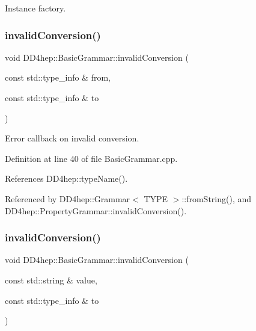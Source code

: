 Instance factory. 

\hypertarget{class_d_d4hep_1_1_basic_grammar_ac609599119a3a478c5701d0b18d4992a}{}\label{class_d_d4hep_1_1_basic_grammar_ac609599119a3a478c5701d0b18d4992a} 
\subsubsection{\texorpdfstring{invalid\+Conversion()}{invalidConversion()}\hspace{0.1cm}{\footnotesize\ttfamily [1/2]}}
{\footnotesize\ttfamily void D\+D4hep\+::\+Basic\+Grammar\+::invalid\+Conversion (\begin{DoxyParamCaption}\item[{const std\+::type\+\_\+info \&}]{from,  }\item[{const std\+::type\+\_\+info \&}]{to }\end{DoxyParamCaption})\hspace{0.3cm}{\ttfamily [static]}}



Error callback on invalid conversion. 



Definition at line 40 of file Basic\+Grammar.\+cpp.



References D\+D4hep\+::type\+Name().



Referenced by D\+D4hep\+::\+Grammar$<$ T\+Y\+P\+E $>$\+::from\+String(), and D\+D4hep\+::\+Property\+Grammar\+::invalid\+Conversion().

\hypertarget{class_d_d4hep_1_1_basic_grammar_a5320dae6f06b901657f0839870a46fa1}{}\label{class_d_d4hep_1_1_basic_grammar_a5320dae6f06b901657f0839870a46fa1} 
\subsubsection{\texorpdfstring{invalid\+Conversion()}{invalidConversion()}\hspace{0.1cm}{\footnotesize\ttfamily [2/2]}}
{\footnotesize\ttfamily void D\+D4hep\+::\+Basic\+Grammar\+::invalid\+Conversion (\begin{DoxyParamCaption}\item[{const std\+::string \&}]{value,  }\item[{const std\+::type\+\_\+info \&}]{to }\end{DoxyParamCaption})\hspace{0.3cm}{\ttfamily [static]}}



